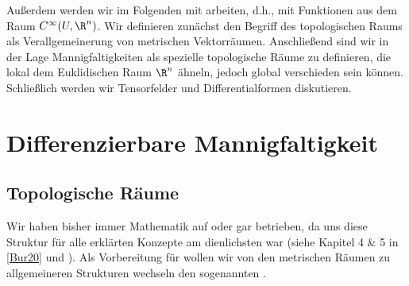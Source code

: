 \documentclass[letterpaper,10pt,german]{jupyterBook}
\begin{document}
\sphinxAtStartPar
Außerdem werden wir im Folgenden mit  arbeiten, d.h., mit Funktionen aus dem Raum \(C^\infty(U,\R^n)\).
Wir definieren zunächst den Begriff des topologischen Raums als Verallgemeinerung von metrischen Vektorräumen.
Anschließend sind wir in der Lage Mannigfaltigkeiten als spezielle topologische Räume zu definieren, die lokal dem Euklidischen Raum \(\R^n\) ähneln, jedoch global verschieden sein können.
Schließlich werden wir Tensorfelder und Differentialformen diskutieren.


\section{Differenzierbare Mannigfaltigkeit}
\label{\detokenize{manifolds/manifolds_prelim:differenzierbare-mannigfaltigkeit}}\label{\detokenize{manifolds/manifolds_prelim::doc}}

\subsection{Topologische Räume}
\label{\detokenize{manifolds/manifolds_prelim:topologische-raume}}
\sphinxAtStartPar
Wir haben bisher immer Mathematik auf  oder gar  betrieben, da uns diese Struktur für alle erklärten Konzepte am dienlichsten war (siehe Kapitel 4 \& 5 in {[}\hyperlink{cite.references:id2}{Bur20}{]} und ).
Als Vorbereitung für {\hyperref[\detokenize{manifolds/manifolds_prelim:s-mannigfaltigkeiten}]{}} wollen wir von den metrischen Räumen zu allgemeineren Strukturen wechseln \sphinxhyphen{} den sogenannten .
\end{document}
